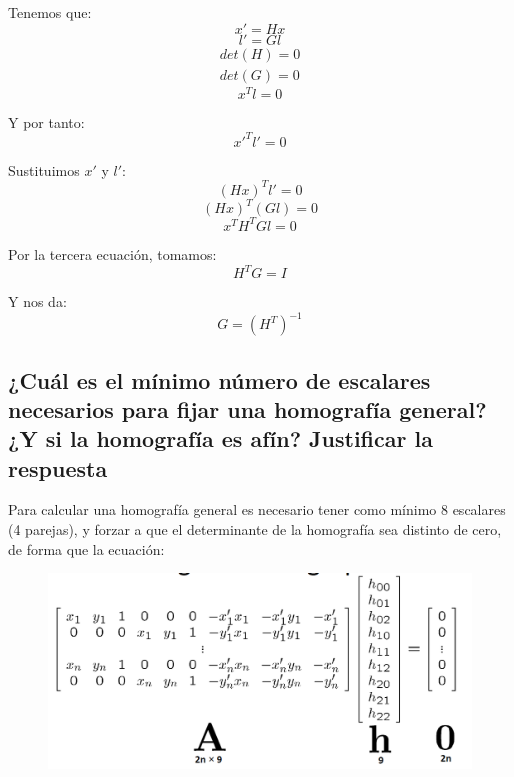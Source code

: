 \documentclass[11pt]{scrartcl} %
\begin{document}
Tenemos que:
\begin{equation}
	x' = H x
\end{equation}
\begin{equation}
	l' = G l
\end{equation}
\begin{equation}
	\begin{aligned}
		det(H) = 0 \\
		det(G) = 0		
	\end{aligned}
\end{equation}
\begin{equation}
	x^{T} l = 0
\end{equation}

Y por tanto:
\begin{equation}
	x'^{T} l' = 0
\end{equation}

Sustituimos $x'$ y $l'$:
\begin{equation}
	(Hx)^{T} l' = 0
\end{equation}
\begin{equation}
	(Hx)^{T} (Gl) = 0
\end{equation}
\begin{equation}
	x^{T} H^{T} G l = 0
\end{equation}

Por la tercera ecuación, tomamos:
\begin{equation}
	H^{T} G = I
\end{equation}

Y nos da:
\begin{equation}
	G = (H^{T})^{-1}
\end{equation}

\subsection{¿Cuál es el mínimo número de escalares necesarios para fijar
una homografía general? ¿Y si la homografía es afín? Justificar la
respuesta}


Para calcular una homografía general es necesario tener como mínimo 8 escalares (4 parejas), 
y forzar a que el determinante de la homografía sea distinto de cero, de forma que
la ecuación:

\begin{figure}[h]
	\centering
	\includegraphics[width=0.5\columnwidth]{6.png}
\end{figure}
\end{document}
